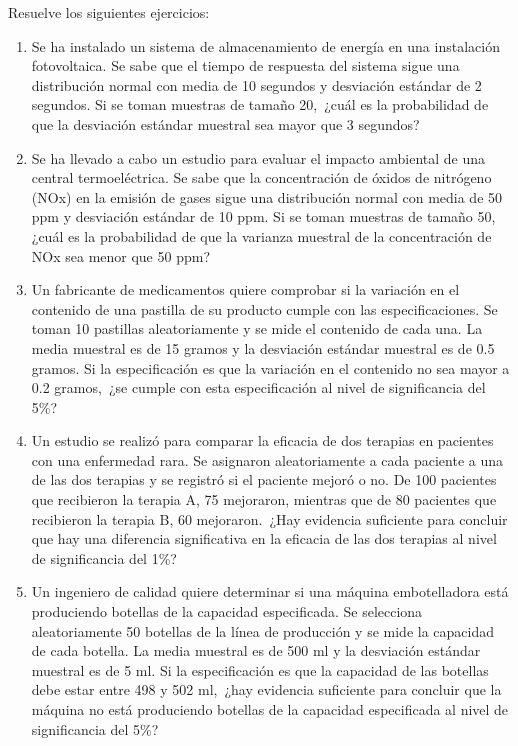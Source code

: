 \begin{Ejer}
Resuelve los siguientes ejercicios:
\begin{enumerate}

\item Se ha instalado un sistema de almacenamiento de energ\'ia en una instalaci\'on fotovoltaica. Se sabe que el tiempo de respuesta del sistema sigue una distribuci\'on normal con media de 10 segundos y desviaci\'on est\'andar de 2 segundos. Si se toman muestras de tama\~no 20, \,¿cu\'al es la probabilidad de que la desviaci\'on est\'andar muestral sea mayor que 3 segundos?

\item Se ha llevado a cabo un estudio para evaluar el impacto ambiental de una central termoel\'ectrica. Se sabe que la concentraci\'on de \'oxidos de nitr\'ogeno (NOx) en la emisi\'on de gases sigue una distribuci\'on normal con media de 50 ppm y desviaci\'on est\'andar de 10 ppm. Si se toman muestras de tama\~no 50, \,¿cu\'al es la probabilidad de que la varianza muestral de la concentraci\'on de NOx sea menor que 50 ppm?

\item Un fabricante de medicamentos quiere comprobar si la variaci\'on en el contenido de una pastilla de su producto cumple con las especificaciones. Se toman 10 pastillas aleatoriamente y se mide el contenido de cada una. La media muestral es de 15 gramos y la desviaci\'on est\'andar muestral es de 0.5 gramos. Si la especificaci\'on es que la variaci\'on en el contenido no sea mayor a 0.2 gramos, \,¿se cumple con esta especificaci\'on al nivel de significancia del 5\%?

\item Un estudio se realiz\'o para comparar la eficacia de dos terapias en pacientes con una enfermedad rara. Se asignaron aleatoriamente a cada paciente a una de las dos terapias y se registr\'o si el paciente mejor\'o o no. De 100 pacientes que recibieron la terapia A, 75 mejoraron, mientras que de 80 pacientes que recibieron la terapia B, 60 mejoraron. \,¿Hay evidencia suficiente para concluir que hay una diferencia significativa en la eficacia de las dos terapias al nivel de significancia del 1\%?

\item Un ingeniero de calidad quiere determinar si una m\'aquina embotelladora est\'a produciendo botellas de la capacidad especificada. Se selecciona aleatoriamente 50 botellas de la l\'inea de producci\'on y se mide la capacidad de cada botella. La media muestral es de 500 ml y la desviaci\'on est\'andar muestral es de 5 ml. Si la especificaci\'on es que la capacidad de las botellas debe estar entre 498 y 502 ml, \,¿hay evidencia suficiente para concluir que la m\'aquina no est\'a produciendo botellas de la capacidad especificada al nivel de significancia del 5\%?


\end{enumerate}
\end{Ejer}
